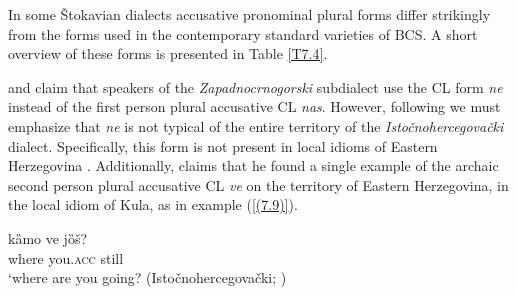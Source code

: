In some Štokavian dialects accusative pronominal plural forms differ strikingly from the forms used in the contemporary standard varieties of BCS. A short overview of these forms is presented in Table \ref{T7.4}.

\begin{table}
\caption{CL forms of the accusative plural pronouns\label{T7.4}}
\end{table}

\largerpage[-2]
\citet[74]{Okuka08} and \citet[152]{Pesikan65} claim that speakers of the \textit{Zapadnocrnogorski} subdialect use the CL form \textit{ne} instead of the first person plural accusative CL \textit{nas}. However, following \citet{Peco07a} we must emphasize that \textit{ne} is not typical of the entire territory of the \textit{Istočnohercegovački} dialect. Specifically, this form is not present in local idioms of Eastern Herzegovina \citep[cf.][297]{Peco07a}. Additionally, \citet[197]{Peco07a} claims that he found a single example of the archaic second person plural accusative CL \textit{ve} on the territory of Eastern Herzegovina, in the local idiom of Kula, as in example (\ref{(7.9)}).

\begin{exe}\ex\label{(7.9)}
\gll kȁmo  ve  jȍš?\\
where you.\textsc{acc} still\\
\glt ‘where are you going?
\hfill  (Istočnohercegovački; \citealt[197]{Peco07a})
\end{exe}


